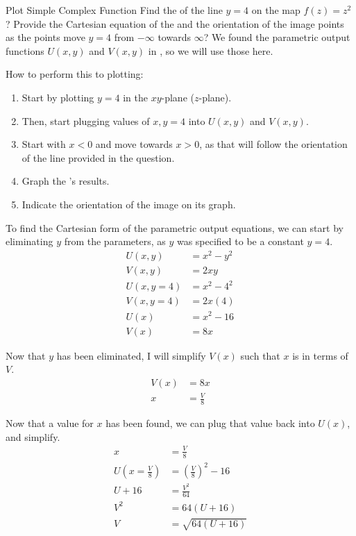 \begin{example}[Lecture 4]{Plot Simple Complex Function}
  Find the  of the line $y=4$ on the map $f(z) = z^{2}$?
  Provide the Cartesian equation of the  and the orientation of the image points as the  points move $y=4$ from $-\infty$ towards $\infty$?
  \tcblower{}
  We found the parametric output functions $U(x, y)$ and $V(x, y)$ in , so we will use those here.

  How to perform this  to  plotting:
  \begin{enumerate}[noitemsep]
  \item Start by plotting $y=4$ in the $xy$-plane ($z$-plane).
  \item Then, start plugging values of $x, y=4$ into $U(x, y)$ and $V(x, y)$.
  \item Start with $x < 0$ and move towards $x>0$, as that will follow the orientation of the line provided in the question.
  \item Graph the 's results.
  \item Indicate the orientation of the image on its graph.
  \end{enumerate}

  To find the Cartesian form of the parametric output equations, we can start by eliminating $y$ from the parameters, as $y$ was specified to be a constant $y=4$.
  \begin{align*}
    U(x, y) &= x^{2} - y^{2} \\
    V(x, y) &= 2xy \\
    U(x, y=4) &= x^{2} - 4^{2} \\
    V(x, y=4) &= 2x (4) \\
    U(x) &= x^{2}- 16 \\
    V(x) &= 8x
  \end{align*}

  Now that $y$ has been eliminated, I will simplify $V(x)$ such that $x$ is in terms of $V$.
  \begin{align*}
    V(x) &= 8x \\
    x &= \frac{V}{8}
  \end{align*}

  Now that a value for $x$ has been found, we can plug that value back into $U(x)$, and simplify.
  \begin{align*}
    x &= \frac{V}{8} \\
    U \left( x=\frac{V}{8} \right) &= {\left( \frac{V}{8} \right)}^{2} - 16 \\
    U + 16 &= \frac{V^{2}}{64} \\
    V^{2} &= 64 (U + 16) \\
    V &= \sqrt{64 (U+16)}
  \end{align*}


\end{example}

